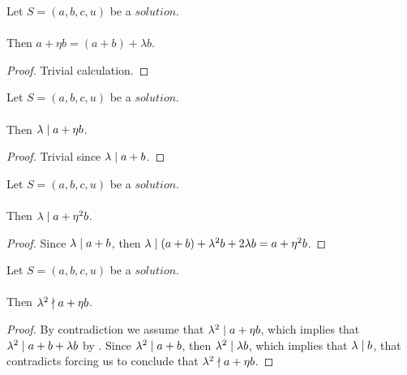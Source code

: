 \begin{lemma}
    \label{lmm:a_add_eta_b}
    \leanok
    Let $S=(a, b, c, u)$ be a $solution$.\\\\
    Then $a + \eta  b = (a + b) + \lambda  b$.
\end{lemma}
\begin{proof}
    \leanok
    Trivial calculation.
\end{proof}

\begin{lemma}
    \label{lmm:lambda_dvd_a_add_eta_mul_b}
    \leanok
    Let $S=(a, b, c, u)$ be a $solution$.\\\\
    Then $\lambda \mid a + \eta  b$.
\end{lemma}
\begin{proof}
    \leanok
    Trivial since $\lambda \mid a+b$.
\end{proof}

\begin{lemma}
    \label{lmm:lambda_dvd_a_add_eta_sq_mul_b}
    \leanok
    Let $S=(a, b, c, u)$ be a $solution$.\\\\
    Then $\lambda \mid a + \eta^2  b$.
\end{lemma}
\begin{proof}
    \leanok
    Since $\lambda \mid a+b$, then
    $\lambda \mid (a + b) + \lambda^2  b + 2  \lambda  b
    = a + \eta^2  b$.
\end{proof}

\begin{lemma}
    \label{lmm:lambda_sq_not_dvd_a_add_eta_mul_b}
    \leanok
    Let $S=(a, b, c, u)$ be a $solution$.\\\\
    Then $\lambda^2 \nmid a + \eta b$.
\end{lemma}
\begin{proof}
    \leanok
    By contradiction we assume that $\lambda^2 \mid a + \eta b$, which implies that
    $\lambda^2 \mid a + b + \lambda  b$ by .
    Since $\lambda^2 \mid a+b$, then $\lambda^2 \mid \lambda  b$, which implies that
    $\lambda \mid b$, that contradicts  forcing us to conclude that
    $\lambda^2 \nmid a + \eta b$.
\end{proof}

